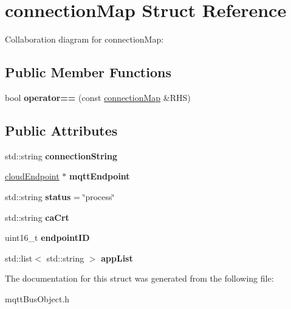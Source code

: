 \hypertarget{structconnectionMap}{}\section{connection\+Map Struct Reference}
\label{structconnectionMap}


Collaboration diagram for connection\+Map\+:
\subsection*{Public Member Functions}
\begin{DoxyCompactItemize}
\item 
bool {\bfseries operator==} (const \hyperlink{structconnectionMap}{connection\+Map} \&R\+HS)\hypertarget{structconnectionMap_ac141b770bd1295eae9e204a63dbd0501}{}\label{structconnectionMap_ac141b770bd1295eae9e204a63dbd0501}

\end{DoxyCompactItemize}
\subsection*{Public Attributes}
\begin{DoxyCompactItemize}
\item 
std\+::string {\bfseries connection\+String}\hypertarget{structconnectionMap_aa67cf2aa9c60c52589f30d38bb50e576}{}\label{structconnectionMap_aa67cf2aa9c60c52589f30d38bb50e576}

\item 
\hyperlink{classcloudEndpoint}{cloud\+Endpoint} $\ast$ {\bfseries mqtt\+Endpoint}\hypertarget{structconnectionMap_aa4a11f8f996b5f3fca53d3e52dcc5ff6}{}\label{structconnectionMap_aa4a11f8f996b5f3fca53d3e52dcc5ff6}

\item 
std\+::string {\bfseries status} = \char`\"{}process\char`\"{}\hypertarget{structconnectionMap_a4bb03ae4dd82607885e8b41150e3c5b8}{}\label{structconnectionMap_a4bb03ae4dd82607885e8b41150e3c5b8}

\item 
std\+::string {\bfseries ca\+Crt}\hypertarget{structconnectionMap_aa6b6549736ba1ca4377ee551c307ecd8}{}\label{structconnectionMap_aa6b6549736ba1ca4377ee551c307ecd8}

\item 
uint16\+\_\+t {\bfseries endpoint\+ID}\hypertarget{structconnectionMap_ac799e731be2ac37423f3917cae1d09c6}{}\label{structconnectionMap_ac799e731be2ac37423f3917cae1d09c6}

\item 
std\+::list$<$ std\+::string $>$ {\bfseries app\+List}\hypertarget{structconnectionMap_a87022e5ecd6197c018a39689d514a063}{}\label{structconnectionMap_a87022e5ecd6197c018a39689d514a063}

\end{DoxyCompactItemize}


The documentation for this struct was generated from the following file\+:\begin{DoxyCompactItemize}
\item 
mqtt\+Bus\+Object.\+h\end{DoxyCompactItemize}

